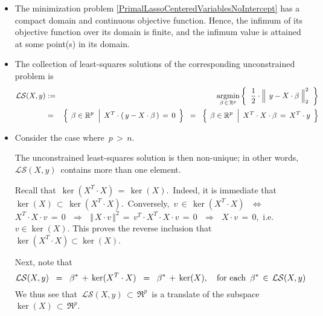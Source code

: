 \begin{itemize}
\item
	The minimization problem \eqref{PrimalLassoCenteredVariablesNoIntercept}
	has a compact domain and continuous objective function.
	Hence, the infimum of its objective function over its domain is finite,
	and the infimum value is attained at some point(s) in its domain.
\item
	The collection of least-squares solutions of the corresponding unconstrained problem is
	\begin{eqnarray*}
	\mathcal{LS}(X,y)
	& := &
		\underset{\beta\,\in\,\Re^{p}}{\argmin}
		\left\{\;\;
			\dfrac{1}{2}
			\cdot
			\left\Vert\;\, y \overset{{\color{white}.}}{-} X\cdot\beta \;\right\Vert_{2}^{2}
			\;\;\right\}
	\\
	& = &
		\left\{\;
			\left.
			\overset{{\color{white}.}}{\beta} \in \Re^{p}
			\;\;\right\vert\;
			X^{T} \cdot (\,y - X\cdot\beta\,) \,=\, 0
			\,\;\right\}
		\;\; = \;\;
		\left\{\;
			\left.
			\overset{{\color{white}.}}{\beta} \in \Re^{p}
			\;\;\right\vert\;
			X^{T} \cdot X \cdot \beta \, = \, X^{T} \cdot y
			\,\;\right\}
	\end{eqnarray*}
\item
	Consider the case where \,{\color{red}$p \,>\, n$}.
	
	\vskip 0.2cm
	The unconstrained least-squares solution is then non-unique;
	in other words, \,$\mathcal{LS}(X,y)$\, contains more than one element.

	\vskip 0.2cm
	Recall that
	\,$\ker(X^{T} \cdot X) \,=\, \ker(X)$.\,
	Indeed, it is immediate that
	\,$\ker(X) \,\subset\, \ker(X^{T} \cdot X)$.\,
	Conversely, \,$v \,\in\, \ker(X^{T} \cdot X)$\,
	\,$\Longleftrightarrow$\, \,$X^{T} \cdot X \cdot v \,=\, 0$\,
	\,$\Longrightarrow$\, \,$\Vert\,X \cdot v\,\Vert^{2} \,=\, v^{T} \cdot X^{T} \cdot X \cdot v \,=\, 0$\,
	\,$\Longrightarrow$\, \,$X \cdot v \,=\, 0$,\,
	i.e. \,$v \in \ker(X)$.
	This proves the reverse inclusion that
	\,$\ker(X^{T} \cdot X) \subset \ker(X)$.

	\vskip 0.2cm
	Next, note that
	\begin{equation*}
	\mathcal{LS}(X,y)
	\;\; = \;\;
		\beta^{*} \,+\, \ker(X^{T}\cdot X)
	\;\; = \;\;
		\beta^{*} \,+\, \ker(X),
	\quad
	\textnormal{for each \,$\beta^{*} \,\in\, \mathcal{LS}(X,y)$}
	\end{equation*}
	We thus see that
	\,{\color{red}$\mathcal{LS}(X,y) \,\subset\, \Re^{p}$\,
	is a translate of the subspace
	\,$\ker(X) \,\subset\, \Re^{p}$.}
	

\end{itemize}
